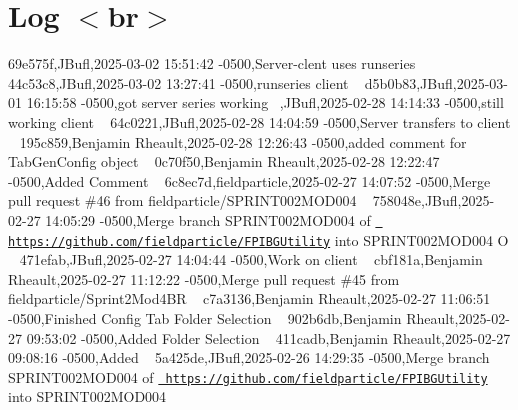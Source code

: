\chapter{Log \texorpdfstring{$<$}{<}br\texorpdfstring{$>$}{>}}
\hypertarget{_activity}{}\label{_activity}
69e575f,JBufl,2025-\/03-\/02 15\+:51\+:42 -\/0500,Server-\/clent uses runseries ~\newline
 44c53c8,JBufl,2025-\/03-\/02 13\+:27\+:41 -\/0500,runseries client ~\newline
 d5b0b83,JBufl,2025-\/03-\/01 16\+:15\+:58 -\/0500,got server series working ~,JBufl,2025-\/02-\/28 14\+:14\+:33 -\/0500,still working client ~\newline
 64c0221,JBufl,2025-\/02-\/28 14\+:04\+:59 -\/0500,Server transfers to client ~\newline
 195c859,Benjamin Rheault,2025-\/02-\/28 12\+:26\+:43 -\/0500,added comment for Tab\+Gen\+Config object ~\newline
 0c70f50,Benjamin Rheault,2025-\/02-\/28 12\+:22\+:47 -\/0500,Added Comment ~\newline
 6c8ec7d,fieldparticle,2025-\/02-\/27 14\+:07\+:52 -\/0500,Merge pull request \#46 from fieldparticle/\+SPRINT002\+MOD004 ~\newline
 758048e,JBufl,2025-\/02-\/27 14\+:05\+:29 -\/0500,Merge branch \textquotesingle{}SPRINT002\+MOD004\textquotesingle{} of \href{https://github.com/fieldparticle/FPIBGUtility}{\texttt{ https\+://github.\+com/fieldparticle/\+FPIBGUtility}} into SPRINT002\+MOD004 O ~\newline
 471efab,JBufl,2025-\/02-\/27 14\+:04\+:44 -\/0500,Work on client ~\newline
 cbf181a,Benjamin Rheault,2025-\/02-\/27 11\+:12\+:22 -\/0500,Merge pull request \#45 from fieldparticle/\+Sprint2\+Mod4\+BR ~\newline
 c7a3136,Benjamin Rheault,2025-\/02-\/27 11\+:06\+:51 -\/0500,Finished Config Tab Folder Selection ~\newline
 902b6db,Benjamin Rheault,2025-\/02-\/27 09\+:53\+:02 -\/0500,Added Folder Selection ~\newline
 411cadb,Benjamin Rheault,2025-\/02-\/27 09\+:08\+:16 -\/0500,Added  ~\newline
 5a425de,JBufl,2025-\/02-\/26 14\+:29\+:35 -\/0500,Merge branch \textquotesingle{}SPRINT002\+MOD004\textquotesingle{} of \href{https://github.com/fieldparticle/FPIBGUtility}{\texttt{ https\+://github.\+com/fieldparticle/\+FPIBGUtility}} into SPRINT002\+MOD004 ~\newline
